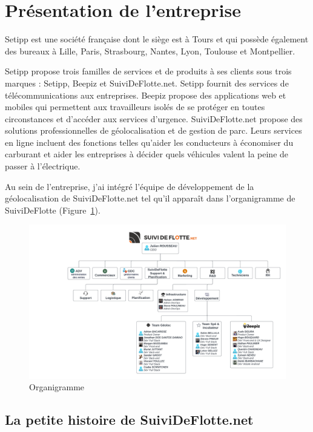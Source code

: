 \section{Présentation de l'entreprise}\label{sec:presentation-entreprise}

Setipp est une société française dont le siège est à Tours et qui possède également des bureaux à Lille, Paris, Strasbourg, Nantes, Lyon, Toulouse et Montpellier.

Setipp propose trois familles de services et de produits à ses clients sous trois marques : Setipp, Beepiz et SuiviDeFlotte.net. Setipp fournit des services de télécommunications aux entreprises. Beepiz propose des applications web et mobiles qui permettent aux travailleurs isolés de se protéger en toutes circonstances et d'accéder aux services d'urgence. SuiviDeFlotte.net propose des solutions professionnelles de géolocalisation et de gestion de parc. Leurs services en ligne incluent des fonctions telles qu'aider les conducteurs à économiser du carburant et aider les entreprises à décider quels véhicules valent la peine de passer à l'électrique.

Au sein de l'entreprise, j'ai intégré l'équipe de développement de la géolocalisation de SuiviDeFlotte.net tel qu'il apparaît dans l'organigramme de SuiviDeFlotte (Figure~\ref{fig:organogram}).

\begin{figure}
    \centering
    \includegraphics[width=\textwidth]{img/organogram}
    \caption{Organigramme}
    \label{fig:organogram}
\end{figure}

\subsection{La petite histoire de SuiviDeFlotte.net}\label{subsec:histoire-sdf}

